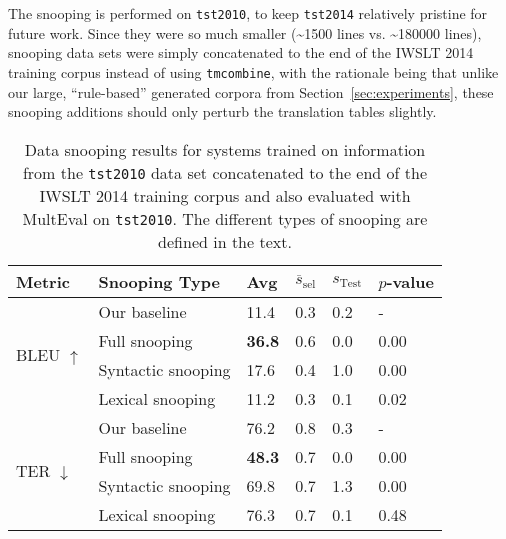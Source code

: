 {The snooping is performed on {\small \tt tst2010}, to keep {\small \tt tst2014} relatively pristine for future work.
Since they were so much smaller (\textasciitilde 1500 lines vs. \textasciitilde 180000 lines), snooping data sets were simply concatenated to the end of the IWSLT 2014 training corpus instead of using {\small \tt tmcombine}, with the rationale being that unlike our large, ``rule-based'' generated corpora from Section~\ref{sec:experiments}, these snooping additions should only perturb the translation tables slightly.



\begin{table}[htb]
\begin{center}
\begin{tabular}{|l|l|l|l|l|l|}
\hline
\bf Metric & \bf Snooping Type & \bf Avg & \bf $\overline{s}_{\text{sel}}$ & \bf $s_{\text{Test}}$ & \bf $p$-value \\
\hline
\multirow{4}{*}{BLEU $\uparrow$}
& Our baseline & 11.4 & 0.3 & 0.2 & - \\
& Full snooping & \textbf{36.8} & 0.6 & 0.0 & 0.00 \\
& Syntactic snooping & 17.6 & 0.4 & 1.0 & 0.00 \\
& Lexical snooping & 11.2 & 0.3 & 0.1 & 0.02 \\
\hline
\multirow{4}{*}{TER $\downarrow$}
& Our baseline & 76.2 & 0.8 & 0.3 & - \\
& Full snooping & \textbf{48.3} & 0.7 & 0.0 & 0.00 \\
& Syntactic snooping & 69.8 & 0.7 & 1.3 & 0.00 \\
& Lexical snooping & 76.3 & 0.7 & 0.1 & 0.48 \\
\hline
\end{tabular}
\end{center}

\caption{ \label{tab:snooping} %
Data snooping results for systems trained on information from the {\small \tt tst2010} data set concatenated to the end of the IWSLT 2014 training corpus and also evaluated with MultEval on {\small \tt tst2010}.
The different types of snooping are defined in the text.
} %
\end{table}

}
